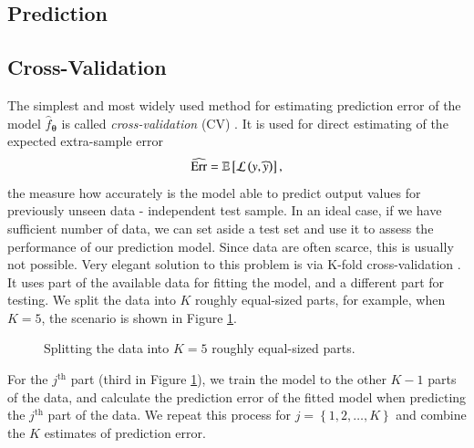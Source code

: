 \subsection{Prediction}

\subsection{Cross-Validation}
The simplest and most widely used method for estimating prediction error of  the model $\hat{f}_{\boldsymbol{\theta}}$ is called \emph{cross-validation} (CV) \cite{statistics}. It is used for direct estimating of the expected extra-sample error
\begin{equation}
	\widehat{\mathrm{Err}} = \mathbb{E}\left[\mathcal{L}\left(y, \widehat{y}\right)\right],
\end{equation}
the measure how accurately is the model able to predict output values for previously unseen data - independent test sample. In an ideal case, if we have sufficient number of data, we can set aside a test set and use
it to assess the performance of our prediction model. Since data are often
scarce, this is usually not possible. Very elegant solution to this problem is via K-fold cross-validation \cite{statistics}. It
uses part of the available data for fitting the model, and a different
part for testing. We split the data into $K$ roughly equal-sized parts, for
example, when $K = 5$, the scenario is shown in Figure \ref{fig:KFOLD}. 
\begin{figure}[h]
\begin{center}
\end{center}
\caption{Splitting the data into $K=5$ roughly equal-sized parts.}
\label{fig:KFOLD}
\end{figure}

For the $j^{\mathrm{th}}$ part (third in Figure \ref{fig:KFOLD}), we train the model to the other $K-1$ parts
of the data, and calculate the prediction error of the fitted model when
predicting the $j^{\mathrm{th}}$ part of the data. We repeat this process for $j = \left\lbrace 1,2,\dots,K\right\rbrace$ and
combine the $K$ estimates of prediction error.

